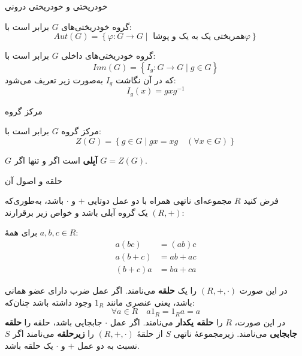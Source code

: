 \begin{frame}[t]{خودریختی و خودریختی درونی}
    \begin{definition}
        گروه خودریختی‌های $G$ برابر است با:
        \[
            Aut(G) = \left\{ \varphi \colon G \to G \mid  \text{ همریختی یک به یک و پوشا} \varphi \right\}
        \]
    \end{definition}

    \begin{definition}
        گروه خودریختی‌های داخلی $G$ برابر است با:
        \[
            Inn(G) = \left\{ I_g \colon G \to G \mid g \in G \right\}
        \]
        که در آن نگاشت $I_g$ به‌صورت زیر تعریف می‌شود:
        \[
            I_g(x) = gxg^{-1}
        \]
    \end{definition}

\end{frame}


\begin{frame}[t]{مرکز گروه}
    \begin{definition}
        مرکز گروه $G$ برابر است با:
        \[
            Z(G) = \left\{ g \in G \mid gx = xg \quad (\forall x \in G) \right\}
        \]
    \end{definition}

    \begin{remark}
        $G$ \textbf{آبِلی} است اگر و تنها اگر $G = Z(G)$.
    \end{remark}




\end{frame}

\begin{frame}[t]{حلقه و اصول آن}
    \begin{definition}[حلقه]
        فرض کنید $R$ مجموعه‌ای ناتهی همراه با دو عمل دوتایی $+$ و $\cdot$ باشد، به‌طوری‌که $(R, +)$ یک گروه آبلی باشد و خواص زیر برقرارند:

        برای همهٔ $a,b,c \in R$:
        \begin{align}
            a(bc)    & = (ab)c \tag{1}   \\
            a(b + c) & = ab + ac \tag{2} \\
            (b + c)a & = ba + ca \tag{3}
        \end{align}

        در این صورت $(R, +, \cdot)$ را یک \textbf{حلقه} می‌نامند.
        اگر عمل ضرب دارای عضو همانی باشد، یعنی عنصری مانند $1_R$ وجود داشته باشد چنان‌که:
        \[
            \forall a \in R \quad a 1_R = 1_R a = a
        \]
        در این صورت، $R$ را \textbf{حلقه یکدار} می‌نامند.
        اگر عمل $\cdot$ جابجایی باشد، حلقه را \textbf{حلقه جابجایی} می‌نامند.
        زیرمجموعهٔ ناتهی $S$ از حلقهٔ $(R, +, \cdot)$ را \textbf{زیرحلقه} می‌نامند اگر $S$ نسبت به دو عمل $+$ و $\cdot$ یک حلقه باشد.

    \end{definition}
\end{frame}

